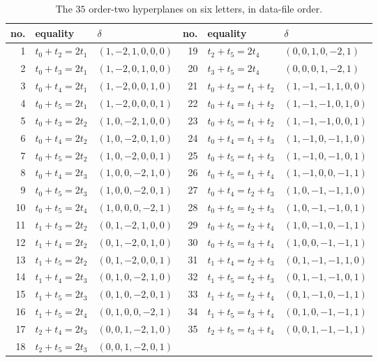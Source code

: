 \documentclass[11pt,reqno]{amsart}
\theoremstyle{plain}
\theoremstyle{definition}
\theoremstyle{plain}
\theoremstyle{plain}
\theoremstyle{plain}
\theoremstyle{plain}
\theoremstyle{plain}
\theoremstyle{plain}
\theoremstyle{definition}
\theoremstyle{definition}
\theoremstyle{definition}
\theoremstyle{plain}
\begin{document}
\begin{table}[htbp]
\caption{The $35$ order-two hyperplanes on six letters, in data-file order.}
\label{S-tab:hyperplanes}
\begin{center}\small
\begin{tabular}{@{}rll@{\qquad}rll@{}}
\toprule
no. & equality & $\delta$ & no. & equality & $\delta$\\
\midrule
1 & $t_0+t_2=2t_1$ & $(1,-2,1,0,0,0)$ & 19 & $t_2+t_5=2t_4$ & $(0,0,1,0,-2,1)$ \\
2 & $t_0+t_3=2t_1$ & $(1,-2,0,1,0,0)$ & 20 & $t_3+t_5=2t_4$ & $(0,0,0,1,-2,1)$ \\
3 & $t_0+t_4=2t_1$ & $(1,-2,0,0,1,0)$ & 21 & $t_0+t_3=t_1+t_2$ & $(1,-1,-1,1,0,0)$ \\
4 & $t_0+t_5=2t_1$ & $(1,-2,0,0,0,1)$ & 22 & $t_0+t_4=t_1+t_2$ & $(1,-1,-1,0,1,0)$ \\
5 & $t_0+t_3=2t_2$ & $(1,0,-2,1,0,0)$ & 23 & $t_0+t_5=t_1+t_2$ & $(1,-1,-1,0,0,1)$ \\
6 & $t_0+t_4=2t_2$ & $(1,0,-2,0,1,0)$ & 24 & $t_0+t_4=t_1+t_3$ & $(1,-1,0,-1,1,0)$ \\
7 & $t_0+t_5=2t_2$ & $(1,0,-2,0,0,1)$ & 25 & $t_0+t_5=t_1+t_3$ & $(1,-1,0,-1,0,1)$ \\
8 & $t_0+t_4=2t_3$ & $(1,0,0,-2,1,0)$ & 26 & $t_0+t_5=t_1+t_4$ & $(1,-1,0,0,-1,1)$ \\
9 & $t_0+t_5=2t_3$ & $(1,0,0,-2,0,1)$ & 27 & $t_0+t_4=t_2+t_3$ & $(1,0,-1,-1,1,0)$ \\
10 & $t_0+t_5=2t_4$ & $(1,0,0,0,-2,1)$ & 28 & $t_0+t_5=t_2+t_3$ & $(1,0,-1,-1,0,1)$ \\
11 & $t_1+t_3=2t_2$ & $(0,1,-2,1,0,0)$ & 29 & $t_0+t_5=t_2+t_4$ & $(1,0,-1,0,-1,1)$ \\
12 & $t_1+t_4=2t_2$ & $(0,1,-2,0,1,0)$ & 30 & $t_0+t_5=t_3+t_4$ & $(1,0,0,-1,-1,1)$ \\
13 & $t_1+t_5=2t_2$ & $(0,1,-2,0,0,1)$ & 31 & $t_1+t_4=t_2+t_3$ & $(0,1,-1,-1,1,0)$ \\
14 & $t_1+t_4=2t_3$ & $(0,1,0,-2,1,0)$ & 32 & $t_1+t_5=t_2+t_3$ & $(0,1,-1,-1,0,1)$ \\
15 & $t_1+t_5=2t_3$ & $(0,1,0,-2,0,1)$ & 33 & $t_1+t_5=t_2+t_4$ & $(0,1,-1,0,-1,1)$ \\
16 & $t_1+t_5=2t_4$ & $(0,1,0,0,-2,1)$ & 34 & $t_1+t_5=t_3+t_4$ & $(0,1,0,-1,-1,1)$ \\
17 & $t_2+t_4=2t_3$ & $(0,0,1,-2,1,0)$ & 35 & $t_2+t_5=t_3+t_4$ & $(0,0,1,-1,-1,1)$ \\
18 & $t_2+t_5=2t_3$ & $(0,0,1,-2,0,1)$ & & & \\
\bottomrule
\end{tabular}
\end{center}
\end{table}
\end{document}
